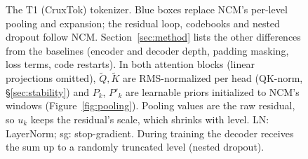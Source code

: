 \documentclass[11pt]{article}
\begin{document}
\begin{figure}[t]
{}
\caption{The T1 (CruxTok) tokenizer. Blue boxes replace NCM's per-level pooling and expansion; the residual loop, codebooks and nested dropout follow NCM. Section~\ref{sec:method} lists the other differences from the baselines (encoder and decoder depth, padding masking, loss terms, code restarts). In both attention blocks (linear projections omitted), $\tilde Q,\tilde K$ are RMS-normalized per head (QK-norm, \S\ref{sec:stability}) and $P_k$, $P'_k$ are learnable priors initialized to NCM's windows (Figure~\ref{fig:pooling}). Pooling values are the raw residual, so $u_k$ keeps the residual's scale, which shrinks with level. LN: LayerNorm; sg: stop-gradient. During training the decoder receives the sum up to a randomly truncated level (nested dropout).}
\label{fig:arch}
\end{figure}
\end{document}
